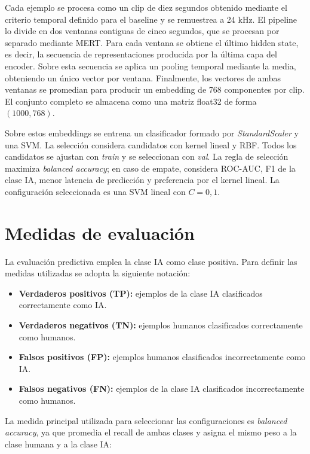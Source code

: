 Cada ejemplo se procesa como un clip de diez segundos obtenido mediante el criterio temporal definido para el baseline y se remuestrea a 24 kHz. El pipeline lo divide en dos ventanas contiguas de cinco segundos, que se procesan por separado mediante MERT. Para cada ventana se obtiene el último hidden state, es decir, la secuencia de representaciones producida por la última capa del encoder. Sobre esta secuencia se aplica un pooling temporal mediante la media, obteniendo un único vector por ventana. Finalmente, los vectores de ambas ventanas se promedian para producir un embedding de 768 componentes por clip. El conjunto completo se almacena como una matriz float32 de forma $(1000, 768)$.

Sobre estos embeddings se entrena un clasificador formado por \textit{StandardScaler} y una SVM. La selección considera candidatos con kernel lineal y RBF. Todos los candidatos se ajustan con \textit{train} y se seleccionan con \textit{val}. La regla de selección maximiza \textit{balanced accuracy}; en caso de empate, considera ROC-AUC, F1 de la clase IA, menor latencia de predicción y preferencia por el kernel lineal. La configuración seleccionada es una SVM lineal con $C=0{,}1$.

\section{Medidas de evaluación}

La evaluación predictiva emplea la clase IA como clase positiva. Para definir las medidas utilizadas se adopta la siguiente notación:

\begin{itemize}
    \item \textbf{Verdaderos positivos (TP):} ejemplos de la clase IA clasificados correctamente como IA.
    \item \textbf{Verdaderos negativos (TN):} ejemplos humanos clasificados correctamente como humanos.
    \item \textbf{Falsos positivos (FP):} ejemplos humanos clasificados incorrectamente como IA.
    \item \textbf{Falsos negativos (FN):} ejemplos de la clase IA clasificados incorrectamente como humanos.
\end{itemize}

La medida principal utilizada para seleccionar las configuraciones es \textit{balanced accuracy}, ya que promedia el recall de ambas clases y asigna el mismo peso a la clase humana y a la clase IA:

